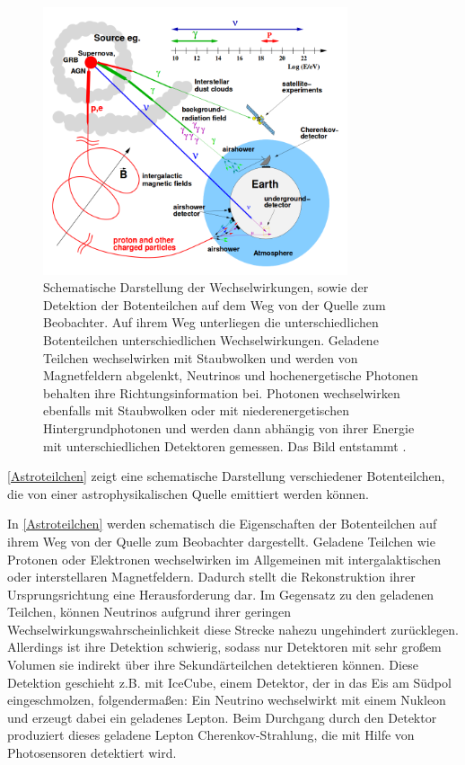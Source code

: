 \begin{figure}
    \centering
    \includegraphics[width=0.8\textwidth]{./Plots/02_Astroteilchenphysik/Astroteilchen.png}
    \caption{Schematische Darstellung der Wechselwirkungen, sowie der Detektion der Botenteilchen auf dem Weg von der Quelle zum Beobachter.
    Auf ihrem Weg unterliegen die unterschiedlichen Botenteilchen unterschiedlichen Wechselwirkungen. 
    Geladene Teilchen wechselwirken mit Staubwolken und werden von Magnetfeldern abgelenkt, Neutrinos und hochenergetische Photonen behalten ihre Richtungsinformation bei.
    Photonen wechselwirken ebenfalls mit Staubwolken oder mit niederenergetischen Hintergrundphotonen und werden dann abhängig von ihrer Energie mit unterschiedlichen Detektoren gemessen. 
    Das Bild entstammt \cite{DissMarlene}.}
    \label{Astroteilchen}
\end{figure}


\autoref{Astroteilchen} zeigt eine schematische Darstellung verschiedener Botenteilchen, die von einer astrophysikalischen Quelle emittiert werden können.

In \autoref{Astroteilchen} werden schematisch die Eigenschaften der Botenteilchen auf ihrem Weg von der Quelle zum Beobachter dargestellt.
Geladene Teilchen wie Protonen oder Elektronen wechselwirken im Allgemeinen mit intergalaktischen oder interstellaren Magnetfeldern.
Dadurch stellt die Rekonstruktion ihrer Ursprungsrichtung eine Herausforderung dar.
Im Gegensatz zu den geladenen Teilchen, können Neutrinos aufgrund ihrer geringen Wechselwirkungswahrscheinlichkeit diese Strecke nahezu ungehindert zurücklegen. 
Allerdings ist ihre Detektion schwierig, sodass nur Detektoren mit sehr großem Volumen sie indirekt über ihre Sekundärteilchen detektieren können.
Diese Detektion geschieht z.B. mit IceCube, einem Detektor, der in das Eis am Südpol eingeschmolzen, folgendermaßen:
Ein Neutrino wechselwirkt mit einem Nukleon und erzeugt dabei ein geladenes Lepton. 
Beim Durchgang durch den Detektor produziert dieses geladene Lepton Cherenkov-Strahlung, die mit Hilfe von Photosensoren detektiert wird.

